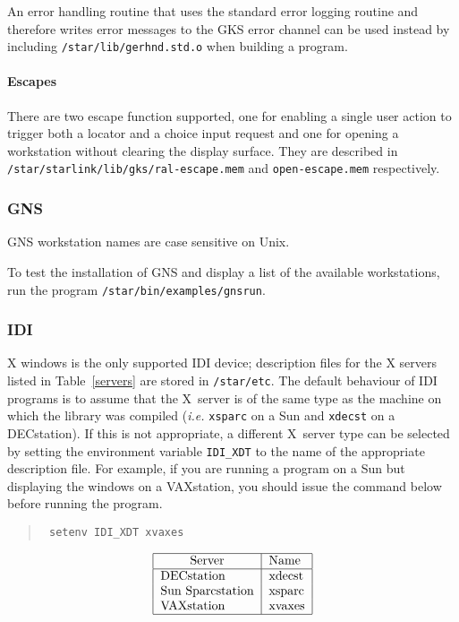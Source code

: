 An error handling routine that uses the standard error logging routine and
therefore writes error messages to the GKS error channel can be used instead by
including {\tt /star/lib/gerhnd.std.o} when building a program.

\paragraph{Escapes} 
There are two escape function supported, one for enabling a single 
user action to trigger
both a locator and a choice input request and one for opening a workstation
without clearing the display surface. They are described in {\tt
/star\-/starlink\-/lib\-/gks\-/ral-escape.mem} and {\tt open-escape.mem}
respectively.

\subsubsection{GNS}

GNS workstation names are case sensitive on Unix.

To test the installation of GNS and display a list of the available
workstations, run the program {\tt /star\-/bin\-/examples\-/gnsrun}.

\subsubsection{IDI}
X windows is the only supported IDI device; description files for the X servers
listed in Table~\ref{servers} are stored in {\tt/star\-/etc}. The default
behaviour of IDI programs is to assume that the X~server is of the same type as
the machine on which the library was compiled ({\it i.e.\/} {\tt xsparc} on 
a Sun and {\tt xdecst}
on a DECstation). If this is not appropriate, a different X~server type can be
selected by setting the environment variable {\tt IDI\_XDT} to the name of the
appropriate description file. For example, if you are running a program on a
Sun but displaying the windows on a VAXstation, you should issue the
command below before running the program.
\begin{quote}\tt
setenv IDI\_XDT xvaxes
\end{quote}
\begin{table}\caption{IDI X server types}\label{servers}
\[\begin{tabular}{|l|l|}
\hline
\multicolumn{1}{|c|}{Server} &Name\\
\hline
DECstation       &xdecst \\
Sun Sparcstation &xsparc \\
VAXstation       &xvaxes \\
\hline
\end{tabular}\]
\end{table}

